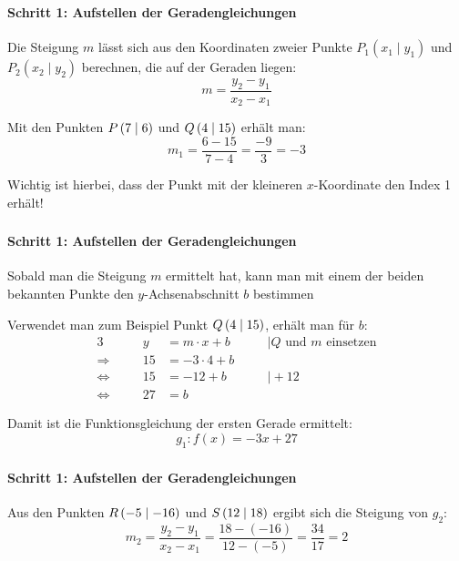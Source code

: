 \documentclass
[
  fontsize = 10pt,
  compress = true,
  ngerman,
  dvipsnames
]
{beamer}
\begin{document}
\begin{frame}
  \frametitle{\sectiontitle}
  \framesubtitle{Schritt 1: Aufstellen der Geradengleichungen}
  Die Steigung $m$ lässt sich aus den Koordinaten zweier
  Punkte $P_1(x_1\mid y_1)$ und $P_2(x_2\mid y_2)$ berechnen,
  die auf der Geraden liegen:
  \begin{equation*}
    m=\frac{y_2-y_1}{x_2-x_1}
  \end{equation*}

  \pause

  Mit den Punkten $P\left(\num{7}\;\middle|\;\num{6}\right)$ und $Q\left(\num{4}\;\middle|\;\num{15}\right)$ erhält man:
  \begin{equation*}
    m_1=\frac{6-15}{7-4}=\frac{-9}{3}=-3
  \end{equation*}

  \alert{Wichtig ist hierbei, dass der Punkt mit der kleineren $x$-Koordinate den Index 1 erhält!}
\end{frame}

\begin{frame}
  \frametitle{\sectiontitle}
  \framesubtitle{Schritt 1: Aufstellen der Geradengleichungen}
  Sobald man die Steigung $m$ ermittelt hat, kann man mit einem der
  beiden bekannten Punkte den $y$-Achsenabschnitt $b$ bestimmen
  \bigskip

  \pause

  Verwendet man zum Beispiel Punkt $Q\left(\num{4}\;\middle|\;\num{15}\right)$, erhält man für $b$:
  \begin{alignat*}{3}
                   &\quad &  y&=m\cdot x+b  & \quad&\mid\text{$Q$ und $m$ einsetzen} \\
    \Rightarrow    &\quad & 15&=-3\cdot 4+b & \quad&        \\
    \Leftrightarrow&\quad & 15&=-12+b       & \quad&\mid+12 \\
    \Leftrightarrow&\quad & 27&=b           & \quad&
  \end{alignat*}

  \pause

  Damit ist die Funktionsgleichung der ersten Gerade ermittelt:
  \begin{equation*}
    g_1:f(x)=-3x+27
  \end{equation*}
\end{frame}

\begin{frame}
  \frametitle{\sectiontitle}
  \framesubtitle{Schritt 1: Aufstellen der Geradengleichungen}
  Aus den Punkten $R\left(\num{-5}\;\middle|\;\num{-16}\right)$ und $S\left(\num{12}\;\middle|\;\num{18}\right)$ ergibt sich die Steigung von $g_2$:
  \begin{equation*}
    m_2=\frac{y_2-y_1}{x_2-x_1}=\frac{18-(-16)}{12-(-5)}=\frac{34}{17}=2
  \end{equation*}
\end{frame}
\end{document}

